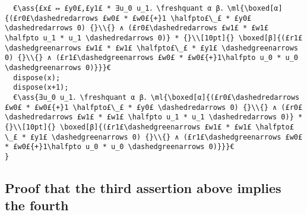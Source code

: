\documentclass[10pt,a4paper]{article}
\makeatletter
\renewcommand{\boxed}[2][]{%
  \renewcommand{\arraystretch}{0.9}%
  \mbox{\mdseries\begin{tabular}{|@{\hspace{2px}}L@{\hspace{2px}}|}\hline #2 \\ \hline \end{tabular}}_{\ifthenelse{\equal{#1}{a}}{\rm a}{\ifthenelse{\equal{#1}{b}}{\rm b}{#1}}}%
}
\newcommand{\freshquant}{\reflectbox{$\mathsf{N}$}}
\newcommand{\ml}[2][t]{\mbox{\mdseries\begin{tabular}[#1]{@{}L@{}}#2\end{tabular}}}
\newcommand{\ass}[1]{\ensuremath{{\color{blue}\left\{\ml[c]{#1}\right\}}}}
\makeatother
\begin{document}
\begin{lstlisting}
  €\ass{£x£ ↦ £y0£,£y1£ * ∃u_0 u_1．\freshquant α β．\ml{\boxed[α]{(£r0£\dashedredarrows £w0£ * £w0£{+}1 \halfpto£\_£ * £y0£ \dashedredarrows 0) {}\\{} ∧ (£r0£\dashedredarrows £w1£ * £w1£ \halfpto u_1 * u_1 \dashedredarrows 0)} * {}\\[10pt]{} \boxed[β]{(£r1£\dashedgreenarrows £w1£ * £w1£ \halfpto£\_£ * £y1£ \dashedgreenarrows 0) {}\\{} ∧ (£r1£\dashedgreenarrows £w0£ * £w0£{+}1\halfpto u_0 * u_0 \dashedgreenarrows 0)}}}€
  dispose(x);
  dispose(x+1);
  €\ass{∃u_0 u_1．\freshquant α β．\ml{\boxed[α]{(£r0£\dashedredarrows £w0£ * £w0£{+}1 \halfpto£\_£ * £y0£ \dashedredarrows 0) {}\\{} ∧ (£r0£\dashedredarrows £w1£ * £w1£ \halfpto u_1 * u_1 \dashedredarrows 0)} * {}\\[10pt]{} \boxed[β]{(£r1£\dashedgreenarrows £w1£ * £w1£ \halfpto£\_£ * £y1£ \dashedgreenarrows 0) {}\\{} ∧ (£r1£\dashedgreenarrows £w0£ * £w0£{+}1\halfpto u_0 * u_0 \dashedgreenarrows 0)}}}€
}
\end{lstlisting}

\subsection{Proof that the third assertion above implies the fourth}
\end{document}
